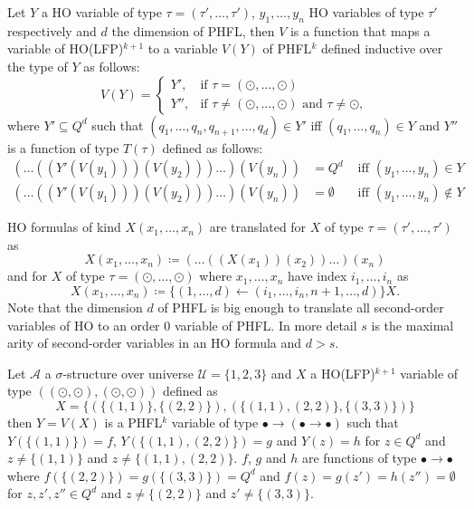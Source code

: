\begin{definition}
    \label{definition:lower_bound_variable_function}
    Let $Y$ a HO variable of type $\tau = (\tau', \dots, \tau')$, $y_1, \dots, y_n$ HO variables of type
    $\tau'$ respectively and $d$ the dimension of PHFL, then $V$ is a function that maps a variable
    of HO(LFP)$^{k + 1}$ to a
    variable $V(Y)$ of PHFL$^k$ defined inductive over the type of $Y$ as follows:
    \[V(Y)=
    \begin{cases}
        Y',  & \text{if }\tau = (\odot, \dots, \odot)\\
        Y'', & \text{if }\tau \neq (\odot, \dots, \odot) \text{ and } \tau \neq \odot,
    \end{cases}\]
    where $Y' \subseteq Q^d$ such that $(q_1, \dots, q_n, q_{n + 1}, \dots, q_d) \in Y'$ iff $(q_1, \dots, q_n) \in Y$
    and $Y''$ is a function of type $T(\tau)$ defined as follows:
    \begin{align*}
        (\dots((Y'(V(y_1)))(V(y_2)))\dots)(V(y_n)) &= Q^d &\text{ iff } (y_1, \dots, y_n) \in Y\\
        (\dots((Y'(V(y_1)))(V(y_2)))\dots)(V(y_n)) &= \emptyset &\text{ iff } (y_1, \dots, y_n) \not\in Y
    \end{align*}
\end{definition}

HO formulas of kind $X(x_1,\dots, x_n)$ are translated for $X$ of type $\tau =
(\tau', \dots, \tau')$ as
\[X(x_1, \dots, x_n) \coloneqq (\dots ((X(x_1))(x_2))\dots)(x_n)\]
and for $X$ of type $\tau = (\odot, \dots, \odot)$  where $x_1, \dots, x_n$ have index $i_1, \dots, i_n$ as
\[X(x_1, \dots, x_n) \coloneqq \{(1, \dots, d) \leftarrow (i_1, \dots, i_n, n + 1, \dots, d)\} X.\]
Note that the dimension $d$ of PHFL is big enough to translate all second-order variables of HO to an order 0 variable
of PHFL. In more detail $s$ is the maximal arity of second-order variables in an HO formula and $d > s$.

\begin{example}
    Let $\mathcal{A}$ a $\sigma$-structure over universe $\mathcal{U} = \{1, 2, 3\}$ and $X$ a HO(LFP)$^{k + 1}$
    variable of type $((\odot, \odot), (\odot, \odot))$ defined as
    \[X = \{(\{(1, 1)\}, \{(2, 2)\}), (\{(1, 1), (2, 2)\}, \{(3, 3)\})\}\]
    then $Y = V(X)$ is a PHFL$^k$ variable of type $\bullet \rightarrow (\bullet \rightarrow \bullet)$ such that $Y
    (\{(1, 1)\}) = f$, $Y(\{(1, 1), (2, 2)\}) = g$ and $Y(z) = h$ for $z \in Q^d$ and $z \neq \{(1, 1)\}$ and $z \neq \{
    (1, 1), (2, 2)\}$. $f$, $g$ and $h$ are functions of type $\bullet \rightarrow \bullet$ where $f(\{(2, 2)\}) = g
    (\{(3, 3)\}) = Q^d$ and $f(z) = g(z') = h(z'') = \emptyset$ for $z, z', z'' \in Q^d$ and $z \neq \{(2, 2)\}$ and
    $z' \neq \{(3, 3)\}$.
\end{example}

